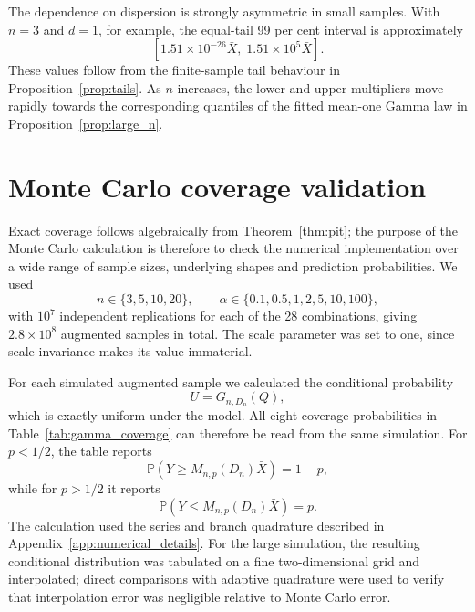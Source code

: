 \documentclass[11pt]{article}
\theoremstyle{remark}
\newcommand{\Pp}{\mathbb P}
\begin{document}
The dependence on dispersion is strongly asymmetric in small samples. With $n=3$ and $d=1$, for example, the equal-tail 99 per cent interval is approximately
\[
 [1.51\times10^{-26}\bar X,\;1.51\times10^5\bar X].
\]
These values follow from the finite-sample tail behaviour in Proposition~\ref{prop:tails}. As $n$ increases, the lower and upper multipliers move rapidly towards the corresponding quantiles of the fitted mean-one Gamma law in Proposition~\ref{prop:large_n}.

\section{Monte Carlo coverage validation}
\label{sec:audit}

Exact coverage follows algebraically from Theorem~\ref{thm:pit}; the purpose of the Monte Carlo calculation is therefore to check the numerical implementation over a wide range of sample sizes, underlying shapes and prediction probabilities. We used
\[
 n\in\{3,5,10,20\},
 \qquad
 \alpha\in\{0.1,0.5,1,2,5,10,100\},
\]
with $10^7$ independent replications for each of the 28 combinations, giving $2.8\times10^8$ augmented samples in total. The scale parameter was set to one, since scale invariance makes its value immaterial.

For each simulated augmented sample we calculated the conditional probability
\[
 U=G_{n,D_n}(Q),
\]
which is exactly uniform under the model. All eight coverage probabilities in Table~\ref{tab:gamma_coverage} can therefore be read from the same simulation. For $p<1/2$, the table reports
\[
 \Pp(Y\ge M_{n,p}(D_n)\bar X)=1-p,
\]
while for $p>1/2$ it reports
\[
 \Pp(Y\le M_{n,p}(D_n)\bar X)=p.
\]
The calculation used the series and branch quadrature described in Appendix~\ref{app:numerical_details}. For the large simulation, the resulting conditional distribution was tabulated on a fine two-dimensional grid and interpolated; direct comparisons with adaptive quadrature were used to verify that interpolation error was negligible relative to Monte Carlo error.
\end{document}
